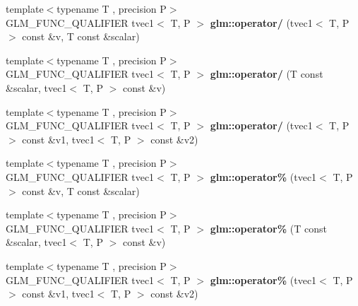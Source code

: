 \begin{DoxyCompactItemize}
\item 
\hypertarget{namespaceglm_a79aa96283b2657fc8a7f0ea00b136f9b}{{\footnotesize template$<$typename T , precision P$>$ }\\G\-L\-M\-\_\-\-F\-U\-N\-C\-\_\-\-Q\-U\-A\-L\-I\-F\-I\-E\-R tvec1$<$ T, P $>$ {\bfseries glm\-::operator/} (tvec1$<$ T, P $>$ const \&v, T const \&scalar)}\label{namespaceglm_a79aa96283b2657fc8a7f0ea00b136f9b}

\item 
\hypertarget{namespaceglm_af39fe57f2735b0e8b57b9fba42a85910}{{\footnotesize template$<$typename T , precision P$>$ }\\G\-L\-M\-\_\-\-F\-U\-N\-C\-\_\-\-Q\-U\-A\-L\-I\-F\-I\-E\-R tvec1$<$ T, P $>$ {\bfseries glm\-::operator/} (T const \&scalar, tvec1$<$ T, P $>$ const \&v)}\label{namespaceglm_af39fe57f2735b0e8b57b9fba42a85910}

\item 
\hypertarget{namespaceglm_adfaadf561e7e396410919ec1b2d55c46}{{\footnotesize template$<$typename T , precision P$>$ }\\G\-L\-M\-\_\-\-F\-U\-N\-C\-\_\-\-Q\-U\-A\-L\-I\-F\-I\-E\-R tvec1$<$ T, P $>$ {\bfseries glm\-::operator/} (tvec1$<$ T, P $>$ const \&v1, tvec1$<$ T, P $>$ const \&v2)}\label{namespaceglm_adfaadf561e7e396410919ec1b2d55c46}

\item 
\hypertarget{namespaceglm_a704a72494268dcda5c74884d706e4995}{{\footnotesize template$<$typename T , precision P$>$ }\\G\-L\-M\-\_\-\-F\-U\-N\-C\-\_\-\-Q\-U\-A\-L\-I\-F\-I\-E\-R tvec1$<$ T, P $>$ {\bfseries glm\-::operator\%} (tvec1$<$ T, P $>$ const \&v, T const \&scalar)}\label{namespaceglm_a704a72494268dcda5c74884d706e4995}

\item 
\hypertarget{namespaceglm_a535623647494259387e01dc72a531034}{{\footnotesize template$<$typename T , precision P$>$ }\\G\-L\-M\-\_\-\-F\-U\-N\-C\-\_\-\-Q\-U\-A\-L\-I\-F\-I\-E\-R tvec1$<$ T, P $>$ {\bfseries glm\-::operator\%} (T const \&scalar, tvec1$<$ T, P $>$ const \&v)}\label{namespaceglm_a535623647494259387e01dc72a531034}

\item 
\hypertarget{namespaceglm_a2de72c33a685ffa2e78ebad4ae9f4e2b}{{\footnotesize template$<$typename T , precision P$>$ }\\G\-L\-M\-\_\-\-F\-U\-N\-C\-\_\-\-Q\-U\-A\-L\-I\-F\-I\-E\-R tvec1$<$ T, P $>$ {\bfseries glm\-::operator\%} (tvec1$<$ T, P $>$ const \&v1, tvec1$<$ T, P $>$ const \&v2)}\label{namespaceglm_a2de72c33a685ffa2e78ebad4ae9f4e2b}


\end{DoxyCompactItemize}
